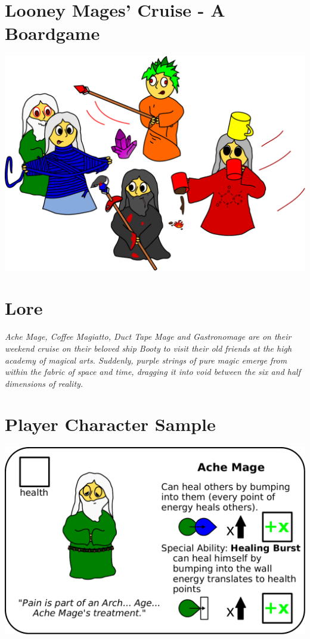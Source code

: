 \documentclass[presentation]{beamer}
\begin{document}
\section{Looney Mages' Cruise - A Boardgame}

\begin{frame}{\insertsection}
	\center
	\includegraphics[width=\textwidth]{../art/concept.pdf}
\end{frame}

\section{Lore}

\begin{frame}{\insertsection}
	\textit{Ache Mage, Coffee Magiatto, Duct Tape Mage and Gastronomage are on their weekend cruise on their beloved ship Booty to visit their old friends at the high academy of magical arts. Suddenly, purple strings of pure magic emerge from within the fabric of space and time, dragging it into void between the six and half dimensions of reality.}
\end{frame}

\section{Player Character Sample}

\begin{frame}{\insertsection}
	\center
	\includegraphics[width=\textheight]{heal_mage.pdf}
\end{frame}
\end{document}
